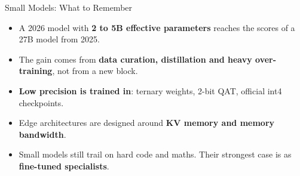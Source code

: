 \begin{frame}{Small Models: What to Remember}
    \begin{itemize}\itemsep0.6em
        \item A 2026 model with \textbf{2 to 5B effective parameters} reaches the scores of a 27B model from 2025.
        \item The gain comes from \textbf{data curation, distillation and heavy over-training}, not from a new block.
        \item \textbf{Low precision is trained in}: ternary weights, 2-bit QAT, official int4 checkpoints.
        \item Edge architectures are designed around \textbf{KV memory and memory bandwidth}.
        \item Small models still trail on hard code and maths. Their strongest case is as \textbf{fine-tuned specialists}.
    \end{itemize}
    \vspace{0.4em}
\end{frame}

